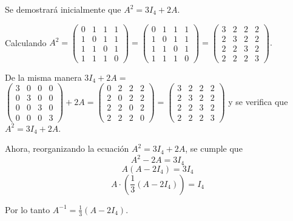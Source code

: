 \begin{myproof} Se demostrará inicialmente que $A^2 = 3I_4 + 2A.$ 

Calculando \(
A^2 = \begin{pmatrix}
0 & 1 & 1 & 1 \\
1 & 0 & 1 & 1 \\
1 & 1 & 0 & 1 \\
1 & 1 & 1 & 0
\end{pmatrix} =
\begin{pmatrix}
0 & 1 & 1 & 1 \\
1 & 0 & 1 & 1 \\
1 & 1 & 0 & 1 \\
1 & 1 & 1 & 0
\end{pmatrix} = 
\begin{pmatrix}
3 & 2 & 2 & 2 \\
2 & 3 & 2 & 2 \\
2 & 2 & 3 & 2 \\
2 & 2 & 2 & 3
\end{pmatrix}
.\) 


De la misma manera $3I_4 + 2A=$ 
\(\begin{pmatrix}
3 & 0 & 0 & 0 \\
0 & 3 & 0 & 0 \\
0 & 0 & 3 & 0 \\
0 & 0 & 0 & 3
\end{pmatrix} +
2A = \begin{pmatrix}
0 & 2 & 2 & 2 \\
2 & 0 & 2 & 2 \\
2 & 2 & 0 & 2 \\
2 & 2 & 2 & 0
\end{pmatrix} = \begin{pmatrix}
3 & 2 & 2 & 2 \\
2 & 3 & 2 & 2 \\
2 & 2 & 3 & 2 \\
2 & 2 & 2 & 3
\end{pmatrix}
\) y se verifica que $A^2 = 3I_4 + 2A$.

Ahora, reorganizando la ecuación $A^2 = 3I_4 + 2A$, se cumple que
\[
A^2 - 2A = 3I_4
\]
\[
A(A - 2I_4) = 3I_4
\]
\[
A \cdot \left( \frac{1}{3} (A - 2I_4) \right) = I_4
\]

Por lo tanto \(
A^{-1} = \frac{1}{3} (A - 2I_4).
\)


\end{myproof}

